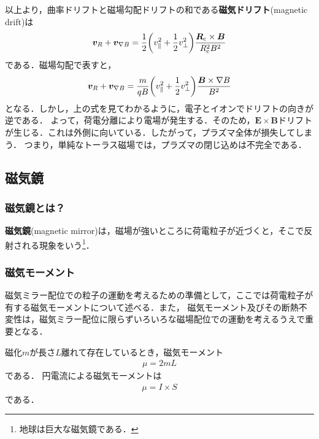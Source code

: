 \documentclass{report}
\begin{document}
          以上より，曲率ドリフトと磁場勾配ドリフトの和である\textbf{磁気ドリフト}(magnetic drift)は
          \begin{align}
            \bm{v}_{R} + \bm{v}_{\nabla B} = \frac{1}{2}\qty(v_{\parallel}^2 + \frac{1}{2}v_{\perp}^2)\frac{\bm{R}_{\mathrm{c}} \times \bm{B}}{R_{\mathrm{c}}^2 B^2}
          \end{align}
          である．磁場勾配で表すと，
          \begin{align}
            \bm{v}_{R} + \bm{v}_{\nabla B} =\frac{m}{qB}\qty(v_{\parallel}^2 + \frac{1}{2}v_{\perp}^2) \frac{\bm{B} \times \nabla B}{B^2}
          \end{align}
          となる．しかし，上の式を見てわかるように，電子とイオンでドリフトの向きが逆である．
          よって，荷電分離により電場が発生する．そのため，$\bm{E}\times\bm{B}$ドリフトが生じる．これは外側に向いている．したがって，プラズマ全体が損失してしまう．
          つまり，単純なトーラス磁場では，プラズマの閉じ込めは不完全である．

    \subsection{磁気鏡}
      \subsubsection{磁気鏡とは？}
        \textbf{磁気鏡}(magnetic mirror)は，磁場が強いところに荷電粒子が近づくと，そこで反射される現象をいう\footnote{地球は巨大な磁気鏡である．}．

      \subsubsection{磁気モーメント}
        磁気ミラー配位での粒子の運動を考えるための準備として，ここでは荷電粒子が有する磁気モーメントについて述べる．また，
        磁気モーメント及びその断熱不変性は，磁気ミラー配位に限らずいろいろな磁場配位での運動を考えるうえで重要となる．

        磁化$m$が長さ$L$離れて存在しているとき，磁気モーメント
        \begin{align}
          \mu = 2mL
        \end{align}
        である．
        円電流による磁気モーメントは
        \begin{align}
          \mu = I \times S
        \end{align}
        である．
\end{document}
